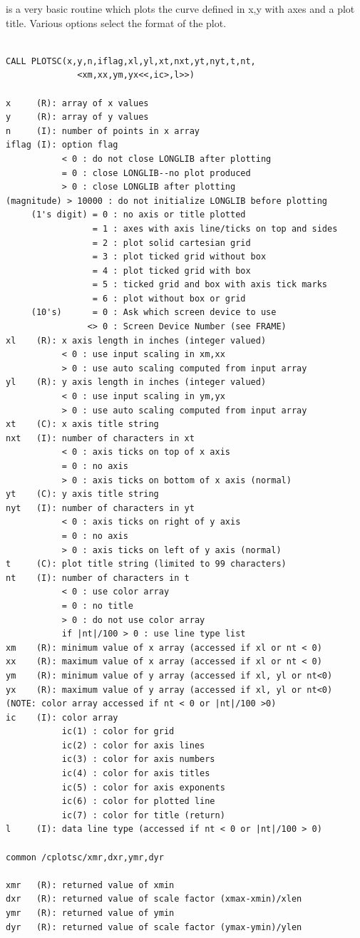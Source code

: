 \documentclass[11pt]{report}
\begin{document}
 is a very basic routine which plots the curve defined
in x,y with axes and a plot title. Various options select the format
of the plot.
\begin{verbatim}

CALL PLOTSC(x,y,n,iflag,xl,yl,xt,nxt,yt,nyt,t,nt,
              <xm,xx,ym,yx<<,ic>,l>>)

x     (R): array of x values
y     (R): array of y values
n     (I): number of points in x array
iflag (I): option flag
           < 0 : do not close LONGLIB after plotting
           = 0 : close LONGLIB--no plot produced
           > 0 : close LONGLIB after plotting
(magnitude) > 10000 : do not initialize LONGLIB before plotting
     (1's digit) = 0 : no axis or title plotted
                 = 1 : axes with axis line/ticks on top and sides
                 = 2 : plot solid cartesian grid
                 = 3 : plot ticked grid without box
                 = 4 : plot ticked grid with box
                 = 5 : ticked grid and box with axis tick marks
                 = 6 : plot without box or grid
     (10's)      = 0 : Ask which screen device to use
                <> 0 : Screen Device Number (see FRAME)
xl    (R): x axis length in inches (integer valued)
           < 0 : use input scaling in xm,xx
           > 0 : use auto scaling computed from input array
yl    (R): y axis length in inches (integer valued)
           < 0 : use input scaling in ym,yx
           > 0 : use auto scaling computed from input array
xt    (C): x axis title string
nxt   (I): number of characters in xt
           < 0 : axis ticks on top of x axis
           = 0 : no axis
           > 0 : axis ticks on bottom of x axis (normal)
yt    (C): y axis title string
nyt   (I): number of characters in yt
           < 0 : axis ticks on right of y axis
           = 0 : no axis
           > 0 : axis ticks on left of y axis (normal)
t     (C): plot title string (limited to 99 characters)
nt    (I): number of characters in t
           < 0 : use color array
           = 0 : no title
           > 0 : do not use color array
           if |nt|/100 > 0 : use line type list
xm    (R): minimum value of x array (accessed if xl or nt < 0)
xx    (R): maximum value of x array (accessed if xl or nt < 0)
ym    (R): minimum value of y array (accessed if xl, yl or nt<0)
yx    (R): maximum value of y array (accessed if xl, yl or nt<0)
(NOTE: color array accessed if nt < 0 or |nt|/100 >0)
ic    (I): color array
           ic(1) : color for grid
           ic(2) : color for axis lines
           ic(3) : color for axis numbers
           ic(4) : color for axis titles
           ic(5) : color for axis exponents
           ic(6) : color for plotted line
           ic(7) : color for title (return)
l     (I): data line type (accessed if nt < 0 or |nt|/100 > 0)

common /cplotsc/xmr,dxr,ymr,dyr

xmr   (R): returned value of xmin
dxr   (R): returned value of scale factor (xmax-xmin)/xlen
ymr   (R): returned value of ymin
dyr   (R): returned value of scale factor (ymax-ymin)/ylen
\end{verbatim}
\end{document}
